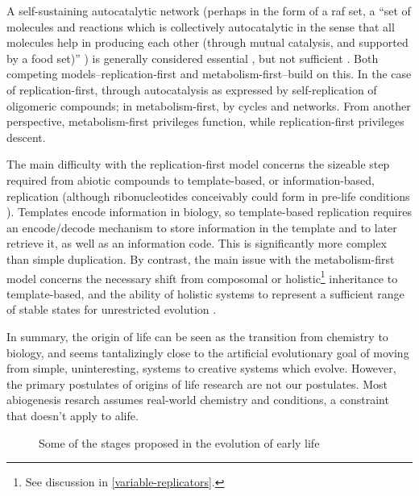 A self-sustaining autocatalytic network (perhaps in the form of a \gls{raf} set, a ``set of molecules and reactions which is collectively autocatalytic in the sense that all molecules help in producing each other (through mutual catalysis, and supported by a food set)'' \parencite{Hordijk2011}) is generally considered essential \parencite{Pross2013}, but not sufficient \parencite{Hordijk2011}. Both competing models--replication-first and metabolism-first--build on this. In the case of replication-first, through autocatalysis as expressed by self-replication of oligomeric compounds; in metabolism-first, by cycles and networks. From another perspective, metabolism-first privileges function, while replication-first privileges descent.

The main difficulty with the replication-first model concerns the sizeable step required from abiotic compounds to template-based, or information-based, replication (although ribonucleotides conceivably could form in pre-life conditions \parencite{Powner2009}). Templates encode information in biology, so template-based replication requires an encode/decode mechanism to store information in the template and to later retrieve it, as well as an information code. This is significantly more complex than simple duplication. By contrast, the main issue with the metabolism-first model concerns the necessary shift from composomal or holistic\footnote{See discussion in \cref{variable-replicators}.} inheritance to template-based, and the ability of holistic systems to represent a sufficient range of stable states for unrestricted evolution \parencite{Vasas2010}.

In summary, the origin of life can be seen as the transition from chemistry to biology, and seems tantalizingly close to the artificial evolutionary goal of moving from simple, uninteresting, systems to creative systems which evolve. However, the primary postulates of origins of life research are not our postulates. Most abiogenesis resarch assumes real-world chemistry and conditions, a constraint that doesn't apply to \gls{alife}. 

\begin{figure}
	\begin{center}
	\end{center}
	\caption{Some of the stages proposed in the evolution of early life}
	\label{major-stages-early-life}
\end{figure}

